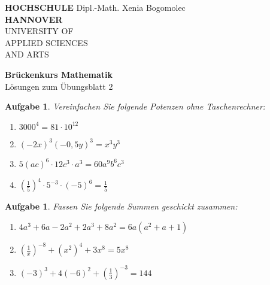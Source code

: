 \documentclass[12pt]{article}
\newtheorem{exercise}[satz]{Aufgabe}
\begin{document}
   \pagestyle{empty}
   \parindent 0cm
   \begin{minipage}{14cm}
   \footnotesize{\textbf{HOCHSCHULE} \hfill Dipl.-Math. Xenia Bogomolec\\
  \textbf{HANNOVER}\\
   UNIVERSITY OF\\
   APPLIED SCIENCES\\
   AND ARTS
   }
   \end{minipage}
   \vspace{1.0cm}

   \begin{center}
     {\Large \bf Br\"uckenkurs Mathematik} \\
     \vspace{0.5cm}
     {\large L\"osungen zum \"Ubungsblatt 2}  \\

  \end{center}
   \vspace{0.5cm}
   \normalsize
   \parindent0cm
   
  \begin{exercise}
  Vereinfachen Sie folgende Potenzen ohne Taschenrechner:
  \begin{multicols}{2}
  \begin{enumerate}
  \item[(a)] $3000^4 = 81\cdot10^{12}$
  \item[(b)] $(-2x)^3(-0,5y)^3 = x^3y^3$
  \item[(c)] $5(ac)^6 \cdot 12c^3 \cdot a^3 = 60a^9b^6c^3$
  \item[(d)] $(\frac{1}{5})^4 \cdot 5^{-3} \cdot (-5)^6 = \frac{1}{5}$
  \end{enumerate}
  \end{multicols}
   \end{exercise}

   \vspace{0.1cm}

  \begin{exercise}
  Fassen Sie folgende Summen geschickt zusammen:
  \begin{enumerate}
  \item[(a)] $4a^3+6a-2a^2+2a^3+8a^2 = 6a(a^2+a+1)$
  \item[(b)] $(\frac{1}{x})^{-8}+(x^2)^4+3x^8 = 5x^8$
  \item[(d)] $(-3)^3+4(-6)^2+(\frac{1}{3})^{-3} = 144$ 
  \end{enumerate}
   \end{exercise}
\end{document}

